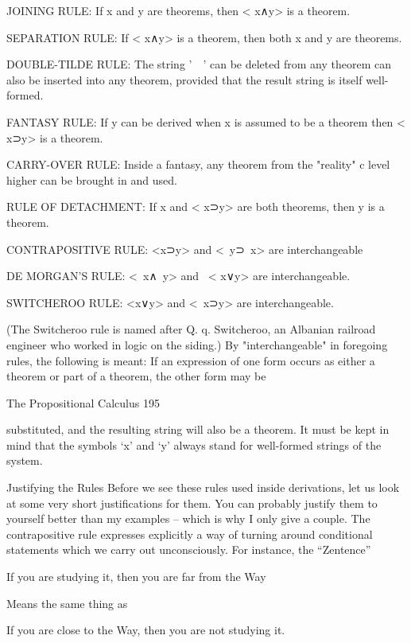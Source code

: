 JOINING RULE: If x and y are theorems, then < x∧y> is a theorem.

SEPARATION RULE: If < x∧y> is a theorem, then both x and y are theorems.

DOUBLE-TILDE RULE: The string '~~' can be deleted from any theorem can also be
  inserted into any theorem, provided that the result string is itself well-formed.

FANTASY RULE: If y can be derived when x is assumed to be a theorem then < x⊃y> is
  a theorem.

CARRY-OVER RULE: Inside a fantasy, any theorem from the "reality" c level higher
  can be brought in and used.

RULE OF DETACHMENT: If x and < x⊃y> are both theorems, then y is a theorem.

CONTRAPOSITIVE RULE: <x⊃y> and <~y⊃~x> are interchangeable

DE MORGAN'S RULE: <~x∧~y> and ~< x∨y> are interchangeable.

SWITCHEROO RULE: <x∨y> and <~x⊃y> are interchangeable.

(The Switcheroo rule is named after Q. q. Switcheroo, an Albanian railroad engineer who
worked in logic on the siding.) By "interchangeable" in foregoing rules, the following is
meant: If an expression of one form occurs as either a theorem or part of a theorem, the
other form may be


The Propositional Calculus                                                                195

substituted, and the resulting string will also be a theorem. It must be kept in mind that
the symbols ‘x’ and ‘y’ always stand for well-formed strings of the system.

                                 Justifying the Rules
Before we see these rules used inside derivations, let us look at some very short
justifications for them. You can probably justify them to yourself better than my
examples – which is why I only give a couple.
        The contrapositive rule expresses explicitly a way of turning around conditional
statements which we carry out unconsciously. For instance, the “Zentence”

       If you are studying it, then you are far from the Way

Means the same thing as

       If you are close to the Way, then you are not studying it.

